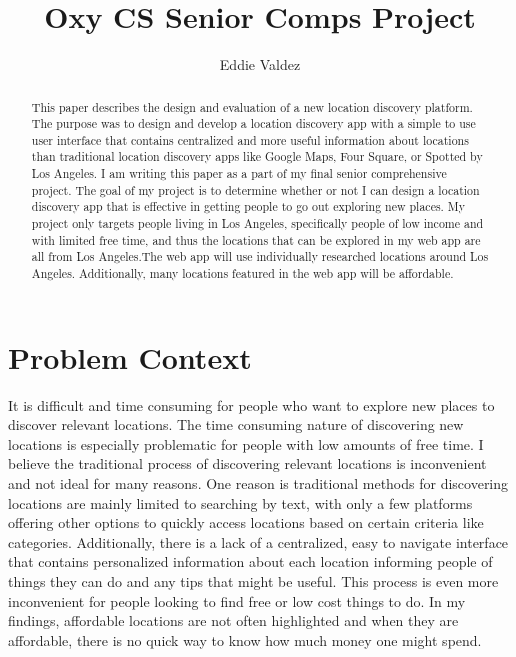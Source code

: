 \documentclass[12pt,twocolumn]{article}
\title{Oxy CS Senior Comps Project}
\author{Eddie Valdez}
\affiliation{Occidental College}
\begin{document}
\maketitle

\begin{abstract}
    This paper describes the design and evaluation of a new location discovery platform. The purpose was to design and develop a location discovery app with a simple to use user interface that contains centralized and more useful information about locations than traditional location discovery apps like Google Maps, Four Square, or Spotted by Los Angeles. I am writing this paper as a part of my final senior comprehensive project. The goal of my project is to determine whether or not I can design a location discovery app that is effective in getting people to go out exploring new places. My project only targets people living in Los Angeles, specifically people of low income and with limited free time, and thus the locations that can be explored in my web app are all from Los Angeles.The web app will use individually researched locations around Los Angeles. Additionally, many locations featured in the web app will be affordable. 

\end{abstract}

\section{Problem Context}
 It is difficult and time consuming for people who want to explore new places to discover relevant locations. The time consuming nature of discovering new locations is especially problematic for people with low amounts of free time. I believe the traditional process of discovering relevant locations is inconvenient and not ideal for many  reasons. One reason is traditional methods for discovering locations are mainly limited to searching by text, with only a few platforms offering other options to quickly access locations based on certain criteria like categories. Additionally, there is a lack of a centralized, easy to navigate interface that contains personalized information about each location informing people of things they can do and any tips that might be useful. This process is even more inconvenient for people looking to find free or low cost things to do. In my findings, affordable locations are not often highlighted and when they are affordable, there is no quick way to know how much money one might spend.  
\end{document}
